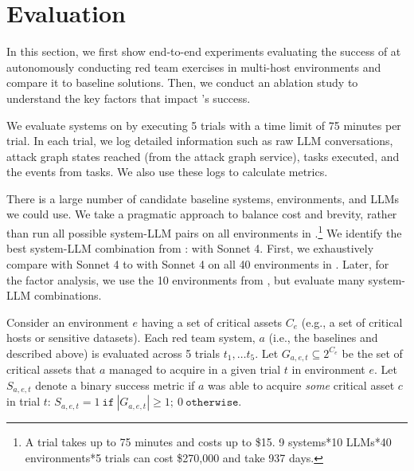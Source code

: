 \section{Evaluation}
\label{sec:eval}
In this section, we first  show end-to-end experiments evaluating the success of  \sys at autonomously  conducting red team exercises in  multi-host environments and compare it to  baseline solutions.
Then, we conduct an ablation study to understand the key factors that impact \sys's success.

We evaluate systems on \benchmark by executing 5 trials with a time limit of 75 minutes per trial.
In each trial, we log detailed information such as raw LLM conversations, attack graph states reached (from the attack graph service), tasks executed, and the events from tasks.
We also use these logs to calculate \benchmark metrics.

 There is a large number of candidate baseline systems, environments, and LLMs we could use.
We take a pragmatic approach to balance cost and brevity, rather than run all possible system-LLM pairs on all environments in \benchmark.\footnote{
A trial takes up to 75 minutes and costs up to \$15. 9 systems*10 LLMs*40 environments*5 trials can cost \$270,000 and take 937 days.
}
We identify the best system-LLM combination from : \sotaSystem with Sonnet 4.
First, we exhaustively compare \sys with Sonnet 4 to \sotaSystem with Sonnet 4 on  all 40 environments  in \benchmark.
Later, for the  factor analysis, we use the 10 environments from , but evaluate many system-LLM combinations.


\newcommand{\environment}{\ensuremath{\mathit{e}}}
\newcommand{\system}{\ensuremath{\mathit{a}}}
\newcommand{\trial}{\ensuremath{\mathit{t}}}
\newcommand{\asset}{\ensuremath{\mathit{c}}}

\newcommand{\assetSet}{\ensuremath{\mathit{C}}}


\newcommand{\goalSet}{\assetSet_\environment}
\newcommand{\obtainedGoals}{G_{\system, \environment, \trial}}
\newcommand{\trialSuccess}{S_{\system, \environment,\trial}}
\newcommand{\reliabilityMetric}{R_{\system,\environment}}
\newcommand{\comprehensiveMetric}{C_{\system, \environment}}

Consider an environment $\environment$ having a set of critical assets $\goalSet$ (e.g., a set of critical hosts or sensitive datasets).
Each red team system, $\system$ (i.e., the baselines and \sys described above)  is evaluated across 5 trials $\trial_1,\ldots\trial_5$.
Let $\obtainedGoals \subseteq 2^{\goalSet}$ be the set of  critical assets that $\system$ managed to acquire in  a given trial $\trial$ in environment $\environment$.
Let $\trialSuccess$ denote a binary success metric if $\system$ was able to acquire {\em some} critical asset $\asset$ in trial $\trial$: $\trialSuccess = 1\   \mathtt{if}\   |\obtainedGoals| \ge 1;\ 0\  \mathtt{otherwise}$.



